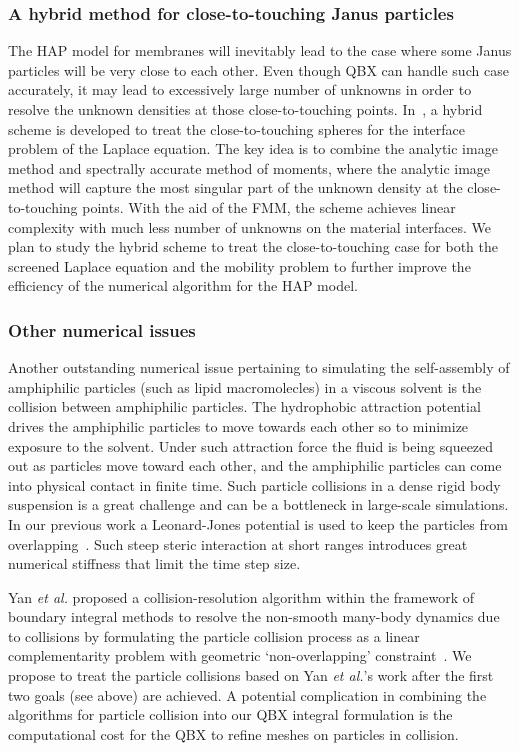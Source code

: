\subsubsection{A hybrid method for close-to-touching Janus particles}
The HAP model for membranes will inevitably lead to the case where some
Janus particles will be very close to each other. Even though QBX can
handle such case accurately, it may lead to excessively large number of
unknowns in order to resolve the unknown densities at those
close-to-touching points. In~\cite{gan2016sisc}, a hybrid scheme is
developed to treat the close-to-touching spheres for the interface
problem of the Laplace equation. The key idea is to combine the analytic
image method and spectrally accurate method of moments, where the
analytic image method will capture the most singular part of the unknown
density at the close-to-touching points. With the aid of the FMM, the
scheme achieves linear complexity with much less number of unknowns on
the material interfaces. We plan to study the hybrid scheme to treat
the close-to-touching case for both the screened Laplace equation and
the mobility problem to further improve the efficiency of the numerical
algorithm for the HAP model.


\subsubsection{Other numerical issues}
Another outstanding numerical issue pertaining to simulating the
self-assembly of amphiphilic particles (such as lipid macromolecles) in
a viscous solvent is the collision between amphiphilic particles. The
hydrophobic attraction potential drives the amphiphilic particles to
move towards each other so to minimize exposure to the solvent. Under
such attraction force the fluid is being squeezed out as particles move
toward each other, and the amphiphilic particles can come into physical
contact in finite time. Such particle collisions in a dense rigid body
suspension is a great challenge and can be a bottleneck in large-scale
simulations. In our previous work a Leonard-Jones potential is used to
keep the particles from overlapping~\cite{Fu2018_SIAM}. Such steep
steric interaction at short ranges introduces great numerical stiffness
that limit the time step size. 

Yan {\it et al.} proposed a collision-resolution algorithm within the
framework of boundary integral methods to resolve the non-smooth
many-body dynamics due to collisions by formulating the particle
collision process as a linear complementarity problem with geometric
`non-overlapping' constraint~\cite{Yan2019}. We propose to treat the
particle collisions based on Yan {\it et al.}'s work after the first two
goals (see above) are achieved. A potential complication in combining
the algorithms for particle collision into our QBX integral formulation
is the computational cost for the QBX to refine meshes on particles in
collision.


